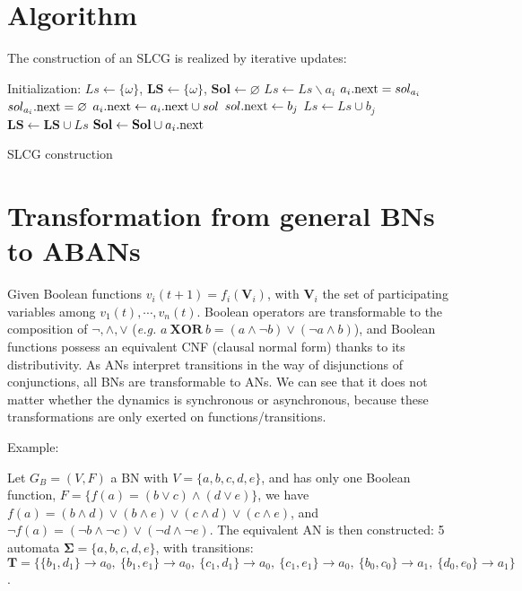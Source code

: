 \documentclass[runningheads]{llncs}
\newcommand{\acm}[3]{#1\rightarrow#2}
\begin{document}
\section{Algorithm}\label{appendix:B}
The construction of an SLCG is realized by iterative updates:
\begin{algorithm}[ht]
\begin{algorithmic}
\State Initialization: 
$Ls\gets \{\omega\}$, $\mathbf{LS}\gets\{\omega\}$, $\mathbf{Sol}\gets \varnothing$
		\State $Ls\gets Ls\backslash a_i$
			\State $a_i{\rm .next}=sol_{a_i}$
            \State $sol_{a_i}{\rm .next}=\varnothing$
    	\Else
    		\For{$sol=\acm{A}{a_{\lnot i}}{a_i}\in \mathbf{T}$}
    			\State $a_i{\rm .next}\gets a_i{\rm .next}\cup sol$
    				\State $sol{\rm .next}\gets b_j$
    			\EndFor
    			\State $Ls\gets Ls\cup b_j$
                \State $\mathbf{LS}\gets \mathbf{LS}\cup Ls$
    		\EndFor
    		\State$\mathbf{Sol}\gets \mathbf{Sol}\cup a_i{\rm .next}$           
    	\EndIf
	\EndFor
\EndWhile
\State{}
\end{algorithmic}
\caption{SLCG construction}
\label{algorithm:2}
\end{algorithm}
\section{Transformation from general BNs to ABANs}\label{appendix:C}

Given Boolean functions $v_i (t+1)=f_i (\mathbf{V}_i)$, with $\mathbf{V}_i$ the set of participating variables among $v_1 (t),\cdots,v_n (t)$. Boolean operators are transformable to the composition of $\lnot,\land,\lor$ (\textit{e.g.} $a\ \mathbf{XOR} \ b = (a\land \lnot b)\lor (\lnot a\land b)$), and Boolean functions possess an equivalent CNF (clausal normal form) thanks to its distributivity. As ANs interpret transitions in the way of disjunctions of conjunctions, all BNs are transformable to ANs. We can see that it does not matter whether the dynamics is synchronous or asynchronous, because these transformations are only exerted on functions/transitions.

Example: 

Let $G_B=(V,F)$ a BN with $V=\{a,b,c,d,e\}$, and has only one Boolean function, $F=\{f (a)= (b\lor c)\land (d\lor e)\}$, we have 
$f (a)= (b\land d)\lor (b\land e)\lor (c\land d)\lor (c\land e)$, and $\lnot f (a)= (\lnot b\land \lnot c)\lor (\lnot d\land \lnot e)$. The equivalent AN is then constructed: 5 automata $\mathbf{\Sigma}=\{a,b,c,d,e\}$, with transitions: $\mathbf{T}=\{\acm{\{b_1,d_1\}}{a_0}{a_1},\ \acm{\{b_1,e_1\}}{a_0}{a_1},\ \acm{\{c_1,d_1\}}{a_0}{a_1},\ \acm{\{c_1,e_1\}}{a_0}{a_1},\ \acm{\{b_0,c_0\}}{a_1}{a_0},\ \acm{\{d_0,e_0\}}{a_1}{a_0}\}$.




\end{document}
